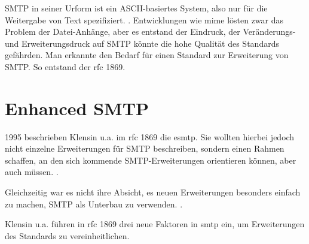 SMTP in seiner Urform ist ein ASCII-basiertes System, also nur für die Weitergabe von Text spezifiziert.  \citep[][21]{rfc821}. Entwicklungen wie \ac{mime} \citep[vgl.][]{rfc1521} lösten zwar das Problem der Datei-Anhänge, aber es entstand der Eindruck, der Veränderungs- und Erweiterungsdruck auf SMTP könnte die hohe Qualität des Standards gefährden. Man erkannte den Bedarf für einen Standard zur Erweiterung von SMTP. So entstand der \ac{rfc} 1869.

\section{Enhanced SMTP}

1995 beschrieben Klensin u.a. im \ac{rfc} 1869 die \ac{esmtp}.
Sie wollten hierbei jedoch nicht einzelne Erweiterungen für SMTP beschreiben, sondern einen Rahmen schaffen, an den sich kommende SMTP-Erweiterungen orientieren können, aber auch müssen.  \citep[][1]{rfc1869}. 

Gleichzeitig war es nicht ihre Absicht, es neuen Erweiterungen besonders einfach zu machen, SMTP als Unterbau zu verwenden.  \citep[][2]{rfc1869}. 

Klensin u.a. führen in \ac{rfc} 1869 drei neue Faktoren in \ac{smtp} ein, um Erweiterungen des Standards zu vereinheitlichen.

